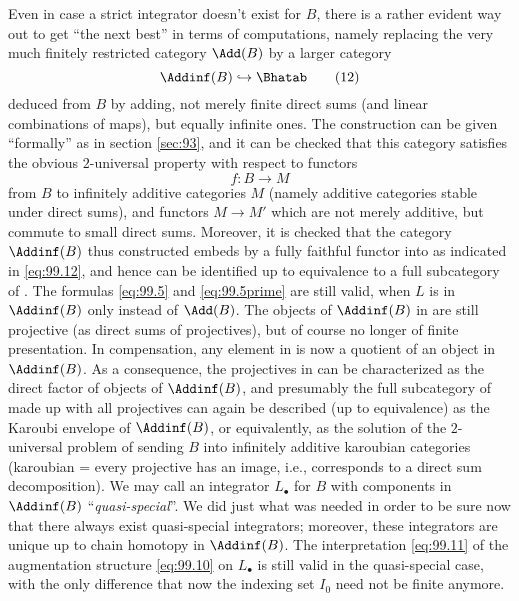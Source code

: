 Even in case a strict integrator doesn't exist for $B$, there is
a rather evident way out to get ``the next best'' in terms of
computations, namely replacing the very much finitely restricted
category $\Add(B)$ by a larger category
\begin{equation}
  \label{eq:99.12}
  \Addinf(B)\hookrightarrow \Bhatab\tag{12}
\end{equation}
deduced from $B$ by adding, not merely finite direct sums (and linear
combinations of maps), but equally infinite ones. The construction can
be given ``formally'' as in section \ref{sec:93}, and it can be
checked that this category satisfies the obvious $2$-universal
property with respect to functors
\[f:B\to M\]
from $B$ to infinitely additive categories $M$ (namely additive
categories stable under direct sums), and functors $M\to M'$ which are
not merely additive, but commute to small direct sums. Moreover, it is
checked that the category $\Addinf(B)$ thus constructed embeds by a
fully faithful functor into \Bhatab{} as indicated in
\eqref{eq:99.12}, and hence can be identified up to equivalence to a
full subcategory of \Bhatab. The formulas \eqref{eq:99.5} and
\eqref{eq:99.5prime} are still valid, when $L$ is in $\Addinf(B)$ only
instead of $\Add(B)$. The objects of $\Addinf(B)$ in \Bhatab{} are
still projective (as direct sums of projectives), but of course no
longer of finite presentation. In compensation, any element in
\Bhatab{} is now a quotient of an object in $\Addinf(B)$. As a
consequence, the projectives in \Bhatab{} can be characterized as the
direct factor of objects of $\Addinf(B)$, and presumably the full
subcategory of \Bhatab{} made up with all projectives can again be
described (up to equivalence) as the Karoubi envelope of $\Addinf(B)$,
or equivalently, as the solution of the $2$-universal problem of
sending $B$ into infinitely additive karoubian categories (karoubian =
every projective has an image, i.e., corresponds to a direct sum
decomposition). We may call an integrator $L_\bullet$ for $B$ with
components in $\Addinf(B)$ ``\emph{quasi-special}''. We did just what
was needed in order to be sure now that there always exist
quasi-special integrators; moreover, these integrators are unique up
to chain homotopy in $\Addinf(B)$. The interpretation \eqref{eq:99.11}
of the augmentation structure \eqref{eq:99.10} on $L_\bullet$ is still
valid in the quasi-special case, with the only difference that now the
indexing set $I_0$ need not be finite anymore.

\clearpage

